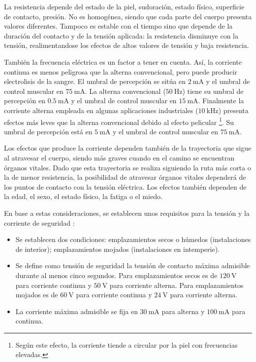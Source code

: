 La resistencia depende del estado de la piel, sudoración, estado físico,
superficie de contacto, presión. No es homogénea, siendo que cada
parte del cuerpo presenta valores diferentes. Tampoco es estable con
el tiempo sino que depende de la duración del contacto y de la tensión
aplicada: la resistencia disminuye con la tensión, realimentandose
los efectos de altos valores de tensión y baja resistencia. 

También la frecuencia eléctrica es un factor a tener en cuenta. Así,
la corriente continua es menos peligrosa que la alterna convencional,
pero puede producir electrolisis de la sangre. El umbral de percepción
se sitúa en $\SI{2}{\milli\ampere}$ y el umbral de control muscular
en $\SI{75}{\milli\ampere}$. La alterna convencional ($\SI{50}{\hertz}$)
tiene su umbral de percepción en $\SI{0.5}{\milli\ampere}$ y el umbral
de control muscular en $\SI{15}{\milli\ampere}$. Finalmente la corriente
alterna empleada en algunas aplicaciones industriales ($\SI{10}{\kilo\hertz}$)
presenta efectos más leves que la alterna convencional debido al efecto
pelicular%
\footnote{Según este efecto, la corriente tiende a circular por la piel con
frecuencias elevadas.%
}. Su umbral de percepción está en $\SI{5}{\milli\ampere}$ y el umbral
de control muscular en $\SI{75}{\milli\ampere}$.

Los efectos que produce la corriente dependen también de la trayectoria
que sigue al atravesar el cuerpo, siendo más graves cuando en el camino
se encuentran órganos vitales. Dado que esta trayectoria se realiza
siguiendo la ruta más corta o la de menor resistencia, la posibilidad
de atravesar órganos vitales dependerá de los puntos de contacto con
la tensión eléctrica. Los efectos también dependen de la edad, el
sexo, el estado físico, la fatiga o el miedo. 

En base a estas consideraciones, se establecen unos requisitos para
la tensión y la corriente de seguridad \cite{RD_842_2002,Gomez-Vidal2000,MestreRovira2002,PerezGabarda2000}: 
\begin{itemize}
\item Se establecen dos condiciones: emplazamientos secos o húmedos (instalaciones
de interior); emplazamientos mojados (instalaciones en intemperie).
\item Se define como tensión de seguridad la tensión de contacto máxima
admisible durante al menos cinco segundos. Para emplazamientos secos
es de $\SI{120}{\volt}$ para corriente continua y $\SI{50}{\volt}$
para corriente alterna. Para emplazamientos mojados es de $\SI{60}{\volt}$
para corriente continua y $\SI{24}{\volt}$ para corriente alterna.
\item La corriente máxima admisible se fija en $\SI{30}{\milli\ampere}$
para alterna y $\SI{100}{\milli\ampere}$ para continua.
\end{itemize}

